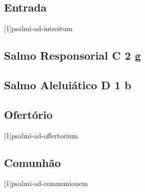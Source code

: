 
\subsection{Entrada}\label{subsection:missae-pro-varii-necessitatibus/pro-pace-et-iustitia-servanda/introitus}
[1]{psalmi-ad-introitum}

\subsection[Salmo Responsorial]{Salmo Responsorial \textmd{C 2 g}}\label{subsection:missae-pro-varii-necessitatibus/pro-pace-et-iustitia-servanda/psalmus-responsorius}

\AllowPageFlush

\subsection[Salmo Aleluiático]{Salmo Aleluiático \textmd{D 1 b}}\label{subsection:missae-pro-varii-necessitatibus/pro-pace-et-iustitia-servanda/psalmus-alleluiaticus}

\AllowPageFlush

\subsection{Ofertório}\label{subsection:missae-pro-varii-necessitatibus/pro-pace-et-iustitia-servanda/offertorium}
[1]{psalmi-ad-offertorium}

\AllowPageFlush

\subsection{Comunhão}\label{subsection:missae-pro-varii-necessitatibus/pro-pace-et-iustitia-servanda/communio-1}
[1]{psalmi-ad-communionem}